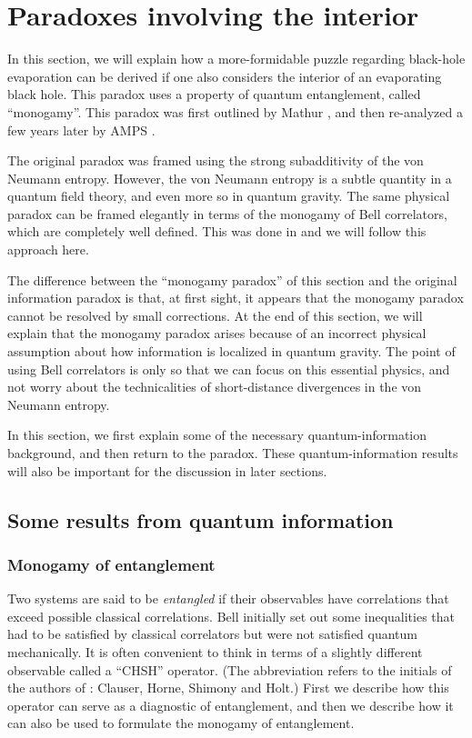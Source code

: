 \documentclass[12pt]{article}
\begin{document}
\section{Paradoxes involving the interior \label{secintpar}}
In this section, we will explain how a more-formidable puzzle regarding black-hole evaporation can be derived if one also considers the interior of an evaporating black hole. This paradox uses a property of quantum entanglement, called ``monogamy''. This paradox was first outlined by Mathur \cite{Mathur:2009hf}, and then re-analyzed a few years later by AMPS \cite{Almheiri:2012rt}.

The original paradox was framed using the strong subadditivity of the von Neumann entropy.  However, the von Neumann entropy is a subtle quantity in a quantum field theory, and even more so in quantum gravity.   The same physical paradox can be framed elegantly in terms of the monogamy of Bell correlators, which are completely well defined. This was done in  \cite{Raju:2018zpn} and we will follow this approach here.

 The difference between the ``monogamy paradox''  of this section and the original information paradox is that, at first sight, it appears that the monogamy paradox cannot be resolved by small corrections. At the end of this section, we will explain that the monogamy paradox arises because of an incorrect physical assumption about how information is localized in quantum gravity. The point of using Bell correlators is only so that we can focus on this essential physics, and not worry about the technicalities of short-distance divergences in the von Neumann entropy.

In this section, we first explain some
of the necessary quantum-information background, and then return to the paradox. These quantum-information results will also be important for the discussion in later sections.

\subsection{Some results from quantum information}
\subsubsection{\bf Monogamy of entanglement \label{secmonogent}}
Two systems are said to be {\em entangled} if their observables have correlations that exceed possible classical correlations. Bell initially set out some inequalities \cite{bell1964einstein} that had to be satisfied by classical correlators but were not satisfied quantum mechanically. It is often convenient to think in terms of a slightly different observable called a ``CHSH'' operator. (The abbreviation refers to the initials of the authors of \cite{Clauser:1969ny}: Clauser, Horne, Shimony and Holt.)
 First we describe how this operator can serve as a diagnostic of entanglement, and then we describe how it can also be used to formulate the monogamy of entanglement.
\end{document}
